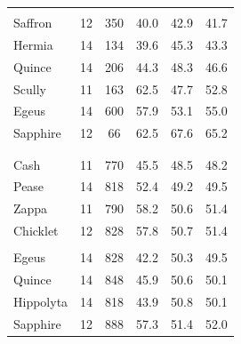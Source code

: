 \documentclass[
  ,pub,floatsintext]{apa6}
\begin{document}
\begin{table}[!h]
\begin{tabular}[t]{lccccc}
\addlinespace[0.3em]
\multicolumn{6}{l}{\textit{Females}}\\
\hspace{1em}\hspace{1em}Saffron & 12 & 350 & 40.0 & 42.9 & 41.7\\
\hspace{1em}\hspace{1em}Hermia & 14 & 134 & 39.6 & 45.3 & 43.3\\
\hspace{1em}\hspace{1em}Quince & 14 & 206 & 44.3 & 48.3 & 46.6\\
\hspace{1em}\hspace{1em}Scully & 11 & 163 & 62.5 & 47.7 & 52.8\\
\hspace{1em}\hspace{1em}Egeus & 14 & 600 & 57.9 & 53.1 & 55.0\\
\hspace{1em}\hspace{1em}Sapphire & 12 & 66 & 62.5 & 67.6 & 65.2\\
\addlinespace[0.3em]
\multicolumn{6}{l}{\textbf{Replicate 2}}\\
\addlinespace[0.3em]
\multicolumn{6}{l}{\textit{Males}}\\
\hspace{1em}\hspace{1em}Cash & 11 & 770 & 45.5 & 48.5 & 48.2\\
\hspace{1em}\hspace{1em}Pease & 14 & 818 & 52.4 & 49.2 & 49.5\\
\hspace{1em}\hspace{1em}Zappa & 11 & 790 & 58.2 & 50.6 & 51.4\\
\hspace{1em}\hspace{1em}Chicklet & 12 & 828 & 57.8 & 50.7 & 51.4\\
\addlinespace[0.3em]
\multicolumn{6}{l}{\textit{Females}}\\
\hspace{1em}\hspace{1em}Egeus & 14 & 828 & 42.2 & 50.3 & 49.5\\
\hspace{1em}\hspace{1em}Quince & 14 & 848 & 45.9 & 50.6 & 50.1\\
\hspace{1em}\hspace{1em}Hippolyta & 14 & 818 & 43.9 & 50.8 & 50.1\\
\hspace{1em}\hspace{1em}Sapphire & 12 & 888 & 57.3 & 51.4 & 52.0\\
\bottomrule
\end{tabular}
\end{table}
\end{document}
